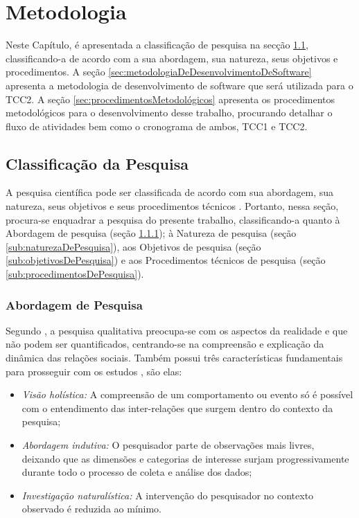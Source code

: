 \newpage

\chapter{Metodologia}
\label{chap:metodologia}

Neste Capítulo, é apresentada a classificação de pesquisa na secção \ref{sec:classificacaoDaPesquisa}, classificando-a de acordo com a sua abordagem, sua natureza, seus objetivos e procedimentos. A seção \ref{sec:metodologiaDeDesenvolvimentoDeSoftware} apresenta a metodologia de desenvolvimento de software que será utilizada para o TCC2. A seção \ref{sec:procedimentosMetodológicos} apresenta os procedimentos metodológicos para o desenvolvimento desse trabalho, procurando detalhar o fluxo de atividades bem como o cronograma de ambos, TCC1 e TCC2.  

\section{Classificação da Pesquisa}
\label{sec:classificacaoDaPesquisa}

A pesquisa científica pode ser classificada de acordo com sua abordagem, sua natureza, seus objetivos e seus procedimentos técnicos \cite{gerhardt2009metodos}. Portanto, nessa seção, procura-se enquadrar a pesquisa do presente trabalho, classificando-a quanto à Abordagem de pesquisa (seção \ref{sub:abordagemDePesquisa}); à Natureza de pesquisa (seção \ref{sub:naturezaDePesquisa}), aos Objetivos de pesquisa (seção \ref{sub:objetivosDePesquisa}) e aos Procedimentos técnicos de pesquisa (seção \ref{sub:procedimentosDePesquisa}).

\subsection{Abordagem de Pesquisa}
\label{sub:abordagemDePesquisa}

Segundo \cite{gerhardt2009metodos}, a pesquisa qualitativa preocupa-se com os aspectos da realidade e que não podem ser quantificados, centrando-se na compreensão e explicação da dinâmica das relações sociais. Também possui três características fundamentais para prosseguir com os estudos \cite{mazzotti1991planejamento}, são elas:

\begin{itemize}
	\item \textit{Visão holística:} A compreensão de um comportamento ou evento só é possível com o entendimento das inter-relações que surgem dentro do contexto da pesquisa;
	\item \textit{Abordagem indutiva:} O pesquisador parte de observações mais livres, deixando que as dimensões e categorias de interesse surjam progressivamente durante todo o processo de coleta e análise dos dados;
	\item \textit{Investigação naturalística:} A intervenção do pesquisador no contexto observado é reduzida ao mínimo.
\end{itemize}

